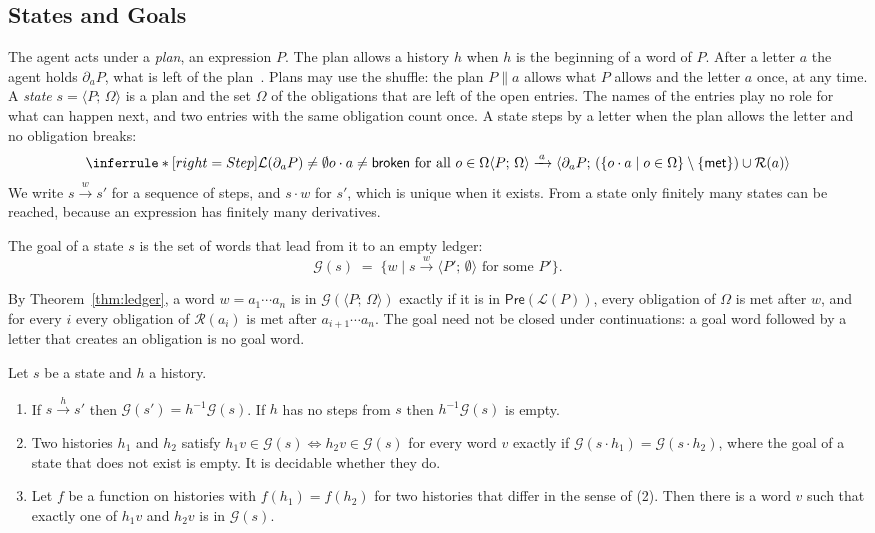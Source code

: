 \documentclass[acmsmall,nonacm,screen]{acmart}
\newcommand{\kw}[1]{\mathsf{#1}}
\newcommand{\st}[2]{\langle #1;\, #2 \rangle}
\newcommand{\lang}[1]{\mathcal{L}(#1)}
\newcommand{\pre}[1]{\kw{Pre}(#1)}
\newcommand{\goal}[1]{\mathcal{G}(#1)}
\newcommand{\rules}{\mathcal{R}}
\newcommand{\met}{\kw{met}}
\newcommand{\brk}{\kw{broken}}
\newcommand{\sh}{\mathbin{\parallel}}
\newcommand{\step}[1]{\xrightarrow{\,#1\,}}
\newcommand{\dv}[2]{\partial_{#1}#2}
\begin{document}
\subsection{States and Goals}

The agent acts under a \emph{plan}, an expression $P$. The plan allows a history $h$ when
$h$ is the beginning of a word of $P$. After a letter $a$ the agent holds $\dv{a}{P}$, what
is left of the plan~\cite{tpp11}. Plans may use the shuffle: the plan $P \sh a$ allows what
$P$ allows and the letter $a$ once, at any time. A \emph{state} $s = \st{P}{\Omega}$ is a
plan and the set $\Omega$ of the obligations that are left of the open entries. The names of
the entries play no role for what can happen next, and two entries with the same obligation
count once. A state steps by a letter when the plan allows the letter and no obligation
breaks:
\[
\inferrule*[right=Step]
  {\lang{\dv{a}{P}} \neq \emptyset \\ o \cdot a \neq \brk \text{ for all } o \in \Omega}
  {\st{P}{\Omega} \step{a} \st{\dv{a}{P}}{(\{o \cdot a \mid o \in \Omega\} \setminus \{\met\}) \cup \rules(a)}}
\]
We write $s \step{w} s'$ for a sequence of steps, and $s \cdot w$ for $s'$, which is unique
when it exists. From a state only finitely many states can be reached, because an expression
has finitely many derivatives.

\begin{definition}[Goal]
\label{def:goal}
The goal of a state $s$ is the set of words that lead from it to an empty ledger:
\[
  \goal{s} \;=\; \{ w \mid s \step{w} \st{P'}{\emptyset} \text{ for some } P' \} .
\]
\end{definition}

By Theorem~\ref{thm:ledger}, a word $w = a_1 \cdots a_n$ is in $\goal{\st{P}{\Omega}}$
exactly if it is in $\pre{\lang{P}}$, every obligation of $\Omega$ is met after $w$, and for
every $i$ every obligation of $\rules(a_i)$ is met after $a_{i+1} \cdots a_n$. The goal need
not be closed under continuations: a goal word followed by a letter that creates an
obligation is no goal word.

\begin{proposition}
\label{prop:quotient}
Let $s$ be a state and $h$ a history.
\begin{enumerate}
\item If $s \step{h} s'$ then $\goal{s'} = h^{-1}\goal{s}$. If $h$ has no steps from $s$ then
  $h^{-1}\goal{s}$ is empty.
\item Two histories $h_1$ and $h_2$ satisfy $h_1 v \in \goal{s} \Leftrightarrow h_2 v \in
  \goal{s}$ for every word $v$ exactly if $\goal{s \cdot h_1} = \goal{s \cdot h_2}$, where
  the goal of a state that does not exist is empty. It is decidable whether they do.
\item Let $f$ be a function on histories with $f(h_1) = f(h_2)$ for two histories that
  differ in the sense of (2). Then there is a word $v$ such that exactly one of $h_1 v$ and
  $h_2 v$ is in $\goal{s}$.
\end{enumerate}
\end{proposition}
\end{document}
